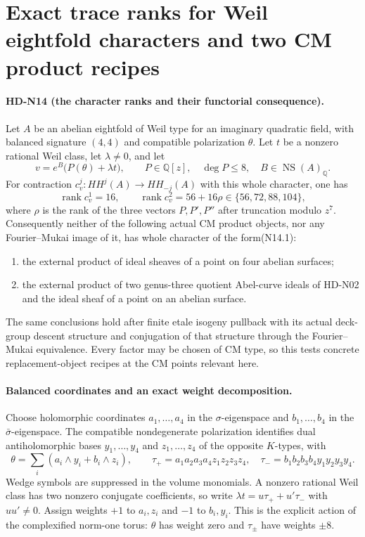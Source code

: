 \section{Exact trace ranks for Weil eightfold characters and two CM product recipes}

\paragraph{HD-N14 (the character ranks and their functorial consequence).}
Let $A$ be an abelian eightfold of Weil type for an imaginary
quadratic field, with balanced signature $(4,4)$ and compatible
polarization $\theta$. Let $t$ be a nonzero rational Weil class,
let $\lambda\ne0$, and let
\[
 v=e^B\bigl(P(\theta)+\lambda t\bigr),
 \qquad P\in\mathbb Q[z],\quad \deg P\le8,
 \quad B\in\operatorname{NS}(A)_{\mathbb Q}.
                                                               \tag{N14.1}
\]
For contraction $c_v^j:HH^j(A)\to HH_{-j}(A)$ with this whole
character, one has
\[
 \operatorname{rank}c_v^1=16,\qquad
 \operatorname{rank}c_v^2=56+16\rho\in\{56,72,88,104\},      \tag{N14.2}
\]
where $\rho$ is the rank of the three vectors
$P,P',P''$ after truncation modulo $z^7$.
Consequently neither of the following actual CM product
objects, nor any Fourier--Mukai image of it, has whole character
of the form(N14.1):
\begin{enumerate}
\item the external product of ideal sheaves of a point on
four abelian surfaces;
\item the external product of two genus-three quotient
Abel-curve ideals of HD-N02 and the ideal sheaf of a point
on an abelian surface.
\end{enumerate}
The same conclusions hold after finite etale isogeny pullback
with its actual deck-group descent structure and conjugation
of that structure through the Fourier--Mukai equivalence.
Every factor may be chosen of CM type, so this tests concrete
replacement-object recipes at the CM points relevant here.

\paragraph{Balanced coordinates and an exact weight decomposition.}
Choose holomorphic coordinates $a_1,\ldots,a_4$ in the
$\sigma$-eigenspace and $b_1,\ldots,b_4$ in the
$\bar\sigma$-eigenspace. The compatible nondegenerate
polarization identifies dual antiholomorphic bases
$y_1,\ldots,y_4$ and $z_1,\ldots,z_4$ of the opposite
$K$-types, with
\[
 \theta=\sum_i(a_i\wedge y_i+b_i\wedge z_i),\qquad
 \tau_+=a_1a_2a_3a_4z_1z_2z_3z_4,
 \quad\tau_-=b_1b_2b_3b_4y_1y_2y_3y_4.                   \tag{N14.3}
\]
Wedge symbols are suppressed in the volume monomials.
A nonzero rational Weil class has two nonzero conjugate
coefficients, so write $\lambda t=u\tau_++u'\tau_-$ with
$uu'\ne0$. Assign weights $+1$ to $a_i,z_i$ and $-1$ to
$b_i,y_i$. This is the explicit action of the complexified
norm-one torus: $\theta$ has weight zero and $\tau_\pm$
have weights $\pm8$.

